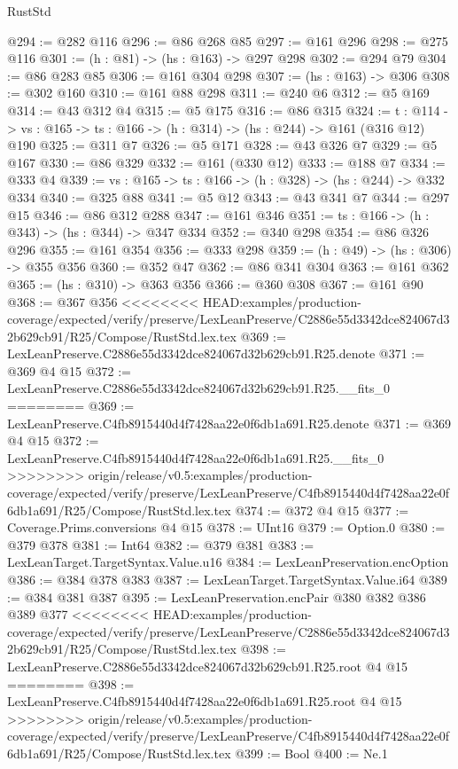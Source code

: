 \begin{lexlean}{RustStd}
\begin{coremodule}
{\begin{coremodule}
@294 := @282 @116
@296 := @86 @268 @85
@297 := @161 @296
@298 := @275 @116
@301 := (h : @81) -> (hs : @163) -> @297 @298
@302 := @294 @79
@304 := @86 @283 @85
@306 := @161 @304 @298
@307 := (hs : @163) -> @306
@308 := @302 @160
@310 := @161 @88 @298
@311 := @240 @6
@312 := @5 @169
@314 := @43 @312 @4
@315 := @5 @175
@316 := @86 @315
@324 := {t : @114} ->
  {vs : @165} -> {ts : @166} -> (h : @314) -> (hs : @244) -> @161 (@316 @12) @190
@325 := @311 @7
@326 := @5 @171
@328 := @43 @326 @7
@329 := @5 @167
@330 := @86 @329
@332 := @161 (@330 @12)
@333 := @188 @7
@334 := @333 @4
@339 := {vs : @165} -> {ts : @166} -> (h : @328) -> (hs : @244) -> @332 @334
@340 := @325 @88
@341 := @5 @12
@343 := @43 @341 @7
@344 := @297 @15
@346 := @86 @312 @288
@347 := @161 @346
@351 := {ts : @166} -> (h : @343) -> (hs : @344) -> @347 @334
@352 := @340 @298
@354 := @86 @326 @296
@355 := @161 @354
@356 := @333 @298
@359 := (h : @49) -> (hs : @306) -> @355 @356
@360 := @352 @47
@362 := @86 @341 @304
@363 := @161 @362
@365 := (hs : @310) -> @363 @356
@366 := @360 @308
@367 := @161 @90
@368 := @367 @356
<<<<<<<< HEAD:examples/production-coverage/expected/verify/preserve/LexLeanPreserve/C2886e55d3342dce824067d32b629cb91/R25/Compose/RustStd.lex.tex
@369 := LexLeanPreserve.C2886e55d3342dce824067d32b629cb91.R25.denote
@371 := @369 @4 @15
@372 := LexLeanPreserve.C2886e55d3342dce824067d32b629cb91.R25.__fits_0
========
@369 := LexLeanPreserve.C4fb8915440d4f7428aa22e0f6db1a691.R25.denote
@371 := @369 @4 @15
@372 := LexLeanPreserve.C4fb8915440d4f7428aa22e0f6db1a691.R25.__fits_0
>>>>>>>> origin/release/v0.5:examples/production-coverage/expected/verify/preserve/LexLeanPreserve/C4fb8915440d4f7428aa22e0f6db1a691/R25/Compose/RustStd.lex.tex
@374 := @372 @4 @15
@377 := Coverage.Prims.conversions @4 @15
@378 := UInt16
@379 := Option.{0}
@380 := @379 @378
@381 := Int64
@382 := @379 @381
@383 := LexLeanTarget.TargetSyntax.Value.u16
@384 := LexLeanPreservation.encOption
@386 := @384 @378 @383
@387 := LexLeanTarget.TargetSyntax.Value.i64
@389 := @384 @381 @387
@395 := LexLeanPreservation.encPair @380 @382 @386 @389 @377
<<<<<<<< HEAD:examples/production-coverage/expected/verify/preserve/LexLeanPreserve/C2886e55d3342dce824067d32b629cb91/R25/Compose/RustStd.lex.tex
@398 := LexLeanPreserve.C2886e55d3342dce824067d32b629cb91.R25.root @4 @15
========
@398 := LexLeanPreserve.C4fb8915440d4f7428aa22e0f6db1a691.R25.root @4 @15
>>>>>>>> origin/release/v0.5:examples/production-coverage/expected/verify/preserve/LexLeanPreserve/C4fb8915440d4f7428aa22e0f6db1a691/R25/Compose/RustStd.lex.tex
@399 := Bool
@400 := Ne.{1}

\end{coremodule}}
\end{coremodule}
\end{lexlean}
